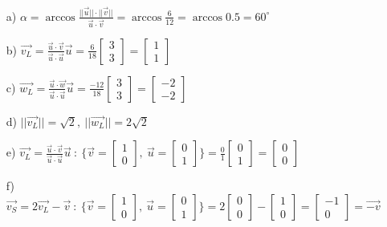 \begin{itemize}
\item[a) ] $\alpha = \arccos{\frac{||\vec{u}|| \cdot ||\vec{v}||}{\vec{u} \cdot \vec{v}}} = \arccos{\frac{6}{12}}=\arccos{0.5}=60^{\circ}$ 
\item[b) ] $\vec{v_{L}}=\frac{\vec{u}\cdot\vec{v}}{\vec{u}\cdot\vec{u}}\vec{u}=\frac{6}{18}\begin{bmatrix}3 \\ 3 \end{bmatrix}= \begin{bmatrix}1 \\ 1 \end{bmatrix}$
\item[c) ] $\vec{w_{L}}=\frac{\vec{u}\cdot\vec{w}}{\vec{u}\cdot\vec{u}}\vec{u}=\frac{-12}{18}\begin{bmatrix}3 \\ 3 \end{bmatrix}= \begin{bmatrix}-2 \\ -2 \end{bmatrix}$
\item[d) ] $||\vec{v_{L}}||= \sqrt{2},\ ||\vec{w_{L}}||=2\sqrt{2} $
\item[e) ] $\vec{v_{L}}=\frac{\vec{u}\cdot\vec{v}}{\vec{u}\cdot\vec{u}}\vec{u}\ :\ \{ \vec{v}=\begin{bmatrix}1 \\ 0 \end{bmatrix},\ \vec{u}=\begin{bmatrix}0 \\ 1 \end{bmatrix}\} =\frac{0}{1}\begin{bmatrix}0 \\ 1 \end{bmatrix}= \begin{bmatrix}0 \\ 0 \end{bmatrix}$
\item[f) ] $\vec{v_{S}}=2\vec{v_{L}}-\vec{v}\ :\ \{ \vec{v}=\begin{bmatrix}1 \\ 0 \end{bmatrix},\ \vec{u}=\begin{bmatrix}0 \\ 1 \end{bmatrix} \} = 2\begin{bmatrix}0 \\ 0 \end{bmatrix}- \begin{bmatrix}1 \\ 0 \end{bmatrix}= \begin{bmatrix}-1 \\ 0 \end{bmatrix}= \vec{-v}$
\end{itemize}